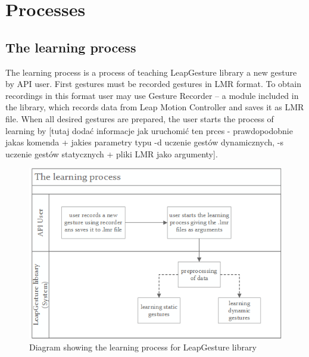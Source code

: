 \section{Processes}\label{processesSection}

\subsection{The learning process}
The learning process is a process of teaching LeapGesture library a new gesture by API user. First  gestures must be recorded gestures in LMR format. To obtain recordings in this format user may use Gesture Recorder --  a module included in the library, which records data from Leap Motion Controller and saves it as LMR file. When all desired gestures are prepared, the user starts the process of learning by {\color{red}[tutaj dodać informacje jak uruchomić ten prces - prawdopodobnie jakas komenda + jakies parametry typu -d uczenie gestów dynamicznych, -s uczenie gestów statycznych + pliki LMR jako argumenty]}.  

\begin{figure}[htb]
\centering
 \includegraphics[width=0.75\columnwidth]{figures/learningProcess.png}
 \caption{Diagram showing the learning process for LeapGesture library}
 \label{learningprocess}
\end{figure}

